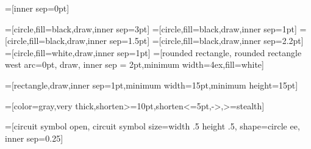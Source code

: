 
\usetikzlibrary{backgrounds,circuits,circuits.ee.IEC,shapes,fit,matrix,automata,decorations.markings}
\UseTwocells


  \tikzset{font=\footnotesize}
  =[inner sep=0pt]

=[circle,fill=black,draw,inner sep=3pt]
=[circle,fill=black,draw,inner sep=1pt]
=[circle,fill=black,draw,inner sep=1.5pt]
=[circle,fill=black,draw,inner sep=2.2pt]
=[circle,fill=white,draw,inner sep=1pt]
=[rounded rectangle, rounded rectangle west arc=0pt, draw, inner
sep = 2pt,minimum width=4ex,fill=white]

=[rectangle,draw,inner sep=1pt,minimum width=15pt,minimum height=15pt]
  
=[color=gray,very thick,shorten>=10pt,shorten<=5pt,->,>=stealth]

=[circuit symbol open,
    circuit symbol size=width .5 height .5,
    shape=circle ee,
  inner sep=0.25\pgflinewidth]

\newcommand{\mult}[1]
{
\begin{aligned}
    \resizebox{#1}{!}{
\begin{tikzpicture}
	\begin{pgfonlayer}{nodelayer}
		\node [style=none] (0) at (1, -0) {};
		\node [style=circ] (1) at (0.125, -0) {};
		\node [style=none] (2) at (-1, 0.5) {};
		\node [style=none] (3) at (-1, -0.5) {};
	\end{pgfonlayer}
	\begin{pgfonlayer}{edgelayer}
		\draw[line width=2pt] (0.center) to (1.center);
		\draw[line width=2pt] [in=0, out=120, looseness=1.20] (1.center) to (2.center);
		\draw[line width=2pt] [in=0, out=-120, looseness=1.20] (1.center) to (3.center);
	\end{pgfonlayer}
      \end{tikzpicture}}
\end{aligned}
}

\newcommand{\unit}[1]
{
  \begin{aligned}
    \resizebox{#1}{!}{
\begin{tikzpicture}
	\begin{pgfonlayer}{nodelayer}
		\node [style=none] (0) at (1, -0) {};
		\node [style=none] (1) at (-1, -0) {};
		\node [style=circ] (2) at (0, -0) {};
	\end{pgfonlayer}
	\begin{pgfonlayer}{edgelayer}
		\draw[line width=2pt] (0.center) to (2);
	\end{pgfonlayer}
      \end{tikzpicture}}
  \end{aligned}
}

